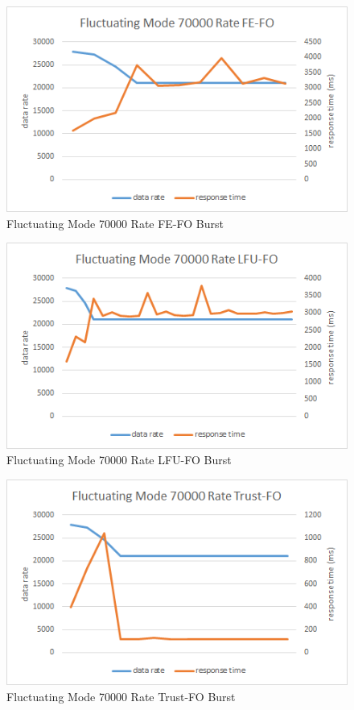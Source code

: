 \begin{figure}[!htbp]
	\centering
	\includegraphics[width=\textwidth]{img/app3-f-70000-fefo.png}
	\caption{Fluctuating Mode 70000 Rate FE-FO Burst}
\end{figure}
\begin{figure}[!htbp]
	\centering
	\includegraphics[width=\textwidth]{img/app3-f-70000-lfufo.png}
	\caption{Fluctuating Mode 70000 Rate LFU-FO Burst}
\end{figure}
\begin{figure}[!htbp]
	\centering
	\includegraphics[width=\textwidth]{img/app3-f-70000-trustfo.png}
	\caption{Fluctuating Mode 70000 Rate Trust-FO Burst}
\end{figure}
